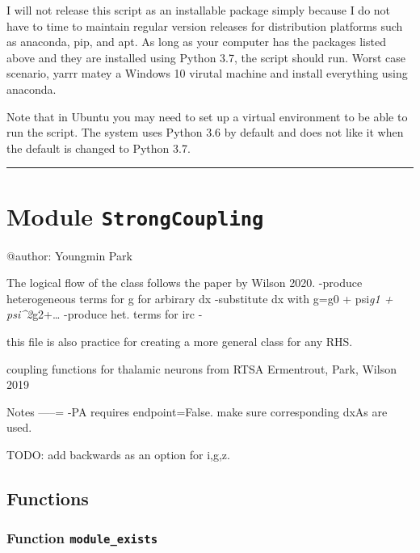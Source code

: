 \documentclass[
  english,
  a4paper,
  oneside]{article}
\begin{document}
I will not release this script as an installable package simply because
I do not have to time to maintain regular version releases for
distribution platforms such as anaconda, pip, and apt. As long as your
computer has the packages listed above and they are installed using
Python 3.7, the script should run. Worst case scenario, yarrr matey a
Windows 10 virutal machine and install everything using anaconda.

Note that in Ubuntu you may need to set up a virtual environment to be
able to run the script. The system uses Python 3.6 by default and does
not like it when the default is changed to Python 3.7.

\begin{center}\rule{0.5\linewidth}{\linethickness}\end{center}

\hypertarget{StrongCoupling}{%
\section{\texorpdfstring{Module
\texttt{StrongCoupling}}{Module StrongCoupling}}\label{StrongCoupling}}

@author: Youngmin Park

The logical flow of the class follows the paper by Wilson 2020. -produce
heterogeneous terms for g for arbirary dx -substitute dx with g=g0 +
psi\emph{g1 + psi\^{}2}g2+\ldots{} -produce het. terms for irc -

this file is also practice for creating a more general class for any
RHS.

coupling functions for thalamic neurons from RTSA Ermentrout, Park,
Wilson 2019

Notes -----= -PA requires endpoint=False. make sure corresponding dxAs
are used.

TODO: add backwards as an option for i,g,z.

\hypertarget{functions}{%
\subsection{Functions}\label{functions}}

\hypertarget{StrongCoupling.module_exists}{%
\subsubsection{\texorpdfstring{Function
\texttt{module\_exists}}{Function module\_exists}}\label{StrongCoupling.module_exists}}
\end{document}
